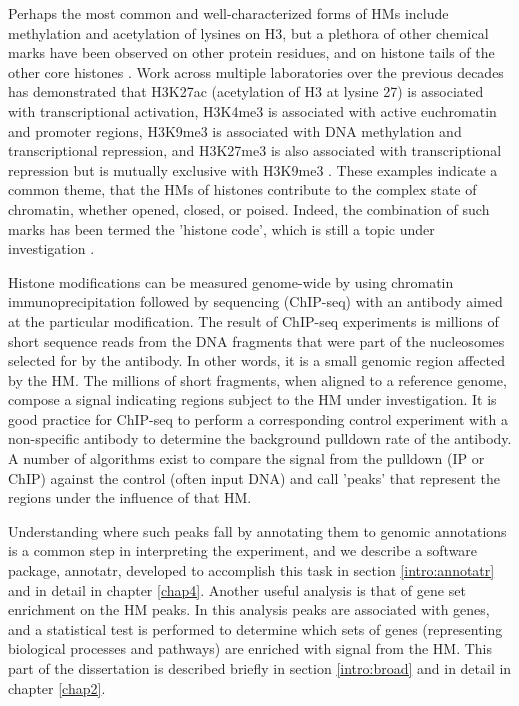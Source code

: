 Perhaps the most common and well-characterized forms of HMs include methylation and acetylation of lysines on H3, but a plethora of other chemical marks have been observed on other protein residues, and on histone tails of the other core histones \cite{Rothbart:2014kf}. Work across multiple laboratories over the previous decades has demonstrated that H3K27ac (acetylation of H3 at lysine 27) is associated with transcriptional activation, H3K4me3 is associated with active euchromatin and promoter regions, H3K9me3 is associated with DNA methylation and transcriptional repression, and H3K27me3 is also associated with transcriptional repression but is mutually exclusive with H3K9me3 \cite{Rothbart:2014kf}. These examples indicate a common theme, that the HMs of histones contribute to the complex state of chromatin, whether opened, closed, or poised. Indeed, the combination of such marks has been termed the 'histone code', which is still a topic under investigation \cite{Strahl:2000jj}.

Histone modifications can be measured genome-wide by using chromatin immunoprecipitation followed by sequencing (ChIP-seq) with an antibody aimed at the particular modification. The result of ChIP-seq experiments is millions of short sequence reads from the DNA fragments that were part of the nucleosomes selected for by the antibody. In other words, it is a small genomic region affected by the HM. The millions of short fragments, when aligned to a reference genome, compose a signal indicating regions subject to the HM under investigation. It is good practice for ChIP-seq to perform a corresponding control experiment with a non-specific antibody to determine the background pulldown rate of the antibody. A number of algorithms exist to compare the signal from the pulldown (IP or ChIP) against the control (often input DNA) \cite{Zhang:2008gm, Xu:2014eh, Zhang:2014cu} and call 'peaks' that represent the regions under the influence of that HM.

Understanding where such peaks fall by annotating them to genomic annotations is a common step in interpreting the experiment, and we describe a software package, annotatr, developed to accomplish this task in section \ref{intro:annotatr} and in detail in chapter \ref{chap4}. Another useful analysis is that of gene set enrichment on the HM peaks. In this analysis peaks are associated with genes, and a statistical test is performed to determine which sets of genes (representing biological processes and pathways) are enriched with signal from the HM. This part of the dissertation is described briefly in section \ref{intro:broad} and in detail in chapter \ref{chap2}.

